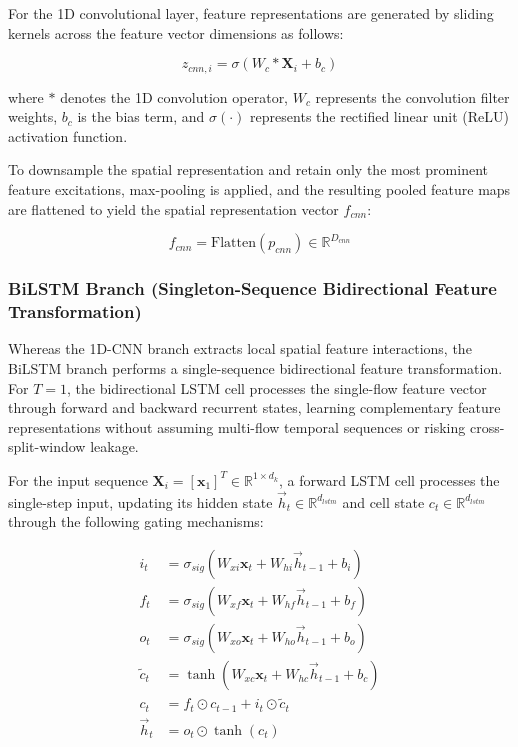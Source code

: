\documentclass[a4paper,fleqn]{cas-sc}
\begin{document}
For the 1D convolutional layer, feature representations are generated by sliding kernels across the feature vector dimensions as follows:

\begin{equation}
z_{cnn, i} = \sigma(W_c * \mathbf{X}_i + b_c)
\end{equation}

where $*$ denotes the 1D convolution operator, $W_c$ represents the convolution filter weights, $b_c$ is the bias term, and $\sigma(\cdot)$ represents the rectified linear unit (ReLU) activation function.

To downsample the spatial representation and retain only the most prominent feature excitations, max-pooling is applied, and the resulting pooled feature maps are flattened to yield the spatial representation vector $f_{cnn}$:

\begin{equation}
f_{cnn} = \text{Flatten}(p_{cnn}) \in \mathbb{R}^{D_{cnn}}
\end{equation}

\subsubsection{BiLSTM Branch (Singleton-Sequence Bidirectional Feature Transformation)}

Whereas the 1D-CNN branch extracts local spatial feature interactions, the BiLSTM branch performs a single-sequence bidirectional feature transformation. For $T=1$, the bidirectional LSTM cell processes the single-flow feature vector through forward and backward recurrent states, learning complementary feature representations without assuming multi-flow temporal sequences or risking cross-split-window leakage.

For the input sequence $\mathbf{X}_i = [\mathbf{x}_1]^T \in \mathbb{R}^{1 \times d_k}$, a forward LSTM cell processes the single-step input, updating its hidden state $\overrightarrow{h}_t \in \mathbb{R}^{d_{lstm}}$ and cell state $c_t \in \mathbb{R}^{d_{lstm}}$ through the following gating mechanisms:

\begin{align}
i_t &= \sigma_{sig} \left( W_{xi} \mathbf{x}_t + W_{hi} \overrightarrow{h}_{t-1} + b_i \right) \\
f_t &= \sigma_{sig} \left( W_{xf} \mathbf{x}_t + W_{hf} \overrightarrow{h}_{t-1} + b_f \right) \\
o_t &= \sigma_{sig} \left( W_{xo} \mathbf{x}_t + W_{ho} \overrightarrow{h}_{t-1} + b_o \right) \\
\tilde{c}_t &= \tanh \left( W_{xc} \mathbf{x}_t + W_{hc} \overrightarrow{h}_{t-1} + b_c \right) \\
c_t &= f_t \odot c_{t-1} + i_t \odot \tilde{c}_t \\
\overrightarrow{h}_t &= o_t \odot \tanh(c_t)
\end{align}
\end{document}
